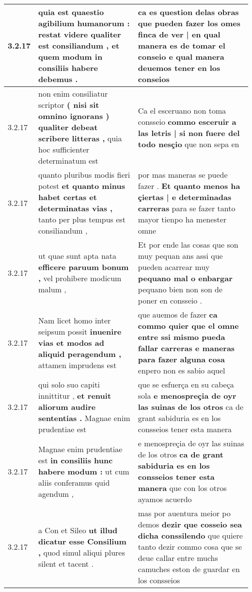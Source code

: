 \begin{tabular}{|p{1cm}|p{6.5cm}|p{6.5cm}|}
3.2.17 & quia est quaestio agibilium humanorum : \textbf{ restat videre qualiter est consiliandum , } et quem modum in consiliis habere debemus . & ca es question delas obras \textbf{ que pueden fazer los omes finca de ver | en qual manera es de tomar el conseio } e qual manera deuemos tener en los conseios \\\hline
3.2.17 & non enim consiliatur scriptor \textbf{ ( nisi sit omnino ignorans ) qualiter debeat scribere litteras , } quia hoc sufficienter determinatum est & Ca el esceruano non toma consseio \textbf{ commo esceruir a las letris | si non fuere del todo nesçio } que non sepa en \\\hline
3.2.17 & quanto pluribus modis fieri potest \textbf{ et quanto minus habet certas et determinatas vias , } tanto per plus tempus est consiliandum , & por mas maneras se puede fazer . \textbf{ Et quanto menos ha çiertas | e determinadas carreras } para se fazer tanto mayor tienpo ha menester omne \\\hline
3.2.17 & ut quae sunt apta nata \textbf{ efficere paruum bonum , } vel prohibere modicum malum , & Et por ende las cosas que son muy pequan ans assi que pueden acarrear muy \textbf{ pequano mal o enbargar } pequano bien non son de poner en consseio . \\\hline
3.2.17 & Nam licet homo inter seipsum possit \textbf{ inuenire vias et modos ad aliquid peragendum , } attamen imprudens est & que auemos de fazer \textbf{ ca commo quier que el omne entre ssi mismo pueda fallar carreras e maneras para fazer alguna cosa } enpero non es sabio aquel \\\hline
3.2.17 & qui solo suo capiti innittitur , \textbf{ et renuit aliorum audire sententias . } Magnae enim prudentiae est & que se esfuerça en su cabeça sola \textbf{ e menospreçia de oyr las suinas de los otros } ca de grant sabiduria es en los consseios tener esta manera \\\hline
3.2.17 & Magnae enim prudentiae est \textbf{ in consiliis hunc habere modum : } ut cum aliis conferamus quid agendum , & e menospreçia de oyr las suinas de los otros \textbf{ ca de grant sabiduria es en los consseios tener esta manera } que con los otros ayamos acuerdo \\\hline
3.2.17 & a Con et Sileo \textbf{ ut illud dicatur esse Consilium , } quod simul aliqui plures silent et tacent . & mas por auentura meior po demos \textbf{ dezir que cosseio sea dicha conssilendo } que quiere tanto dezir commo cosa que se deue callar entre muchs camuches eston de guardar en los consseios \\\hline

\end{tabular}
